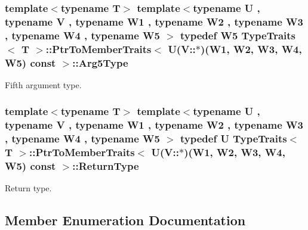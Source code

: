 \subsubsection[{\texorpdfstring{Arg5\+Type}{Arg5Type}}]{\setlength{\rightskip}{0pt plus 5cm}template$<$typename T$>$ template$<$typename U , typename V , typename W1 , typename W2 , typename W3 , typename W4 , typename W5 $>$ typedef W5 {\bf Type\+Traits}$<$ T $>$\+::{\bf Ptr\+To\+Member\+Traits}$<$ U(V\+::$\ast$)(W1, W2, W3, W4, W5) const  $>$\+::{\bf Arg5\+Type}}\hypertarget{structTypeTraits_1_1PtrToMemberTraits_3_01U_07V_1_1_5_08_07W1_00_01W2_00_01W3_00_01W4_00_01W5_08_01const_01_01_4_a2d82f5efcbdcd11214e2ee7f3e8e5da4}{}\label{structTypeTraits_1_1PtrToMemberTraits_3_01U_07V_1_1_5_08_07W1_00_01W2_00_01W3_00_01W4_00_01W5_08_01const_01_01_4_a2d82f5efcbdcd11214e2ee7f3e8e5da4}
Fifth argument type. 
\subsubsection[{\texorpdfstring{Return\+Type}{ReturnType}}]{\setlength{\rightskip}{0pt plus 5cm}template$<$typename T$>$ template$<$typename U , typename V , typename W1 , typename W2 , typename W3 , typename W4 , typename W5 $>$ typedef U {\bf Type\+Traits}$<$ T $>$\+::{\bf Ptr\+To\+Member\+Traits}$<$ U(V\+::$\ast$)(W1, W2, W3, W4, W5) const  $>$\+::{\bf Return\+Type}}\hypertarget{structTypeTraits_1_1PtrToMemberTraits_3_01U_07V_1_1_5_08_07W1_00_01W2_00_01W3_00_01W4_00_01W5_08_01const_01_01_4_a160b7346ccea3332d40fd493350587a5}{}\label{structTypeTraits_1_1PtrToMemberTraits_3_01U_07V_1_1_5_08_07W1_00_01W2_00_01W3_00_01W4_00_01W5_08_01const_01_01_4_a160b7346ccea3332d40fd493350587a5}
Return type. 

\subsection{Member Enumeration Documentation}
